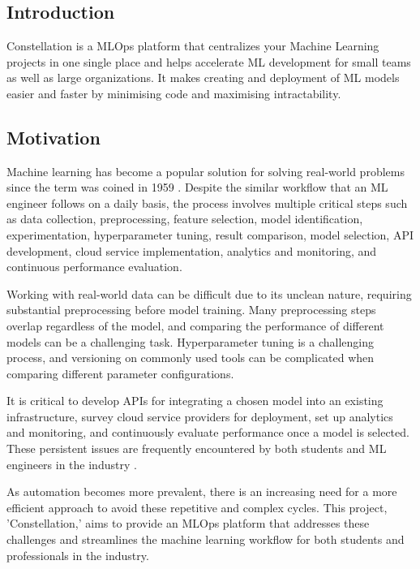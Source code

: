 \documentclass[12pt,a4paper]{report}     %
\begin{document}
\chapter{}
\begin{normalsize}
			\noindent

\section{Introduction} 	
{\setlength{\baselineskip}{1.1\baselineskip}
Constellation is a MLOps platform that centralizes your Machine Learning projects in one single place and helps accelerate ML development for small teams as well as large organizations. It makes creating and deployment of ML models easier and faster by minimising code and maximising intractability.
}	
\section{Motivation}
{\setlength{\baselineskip}{1.1\baselineskip}
Machine learning has become a popular solution for solving real-world problems since the term was coined in 1959 \cite{b1}. Despite the similar workflow that an ML engineer follows on a daily basis, the process involves multiple critical steps such as data collection, preprocessing, feature selection, model identification, experimentation, hyperparameter tuning, result comparison, model selection, API development, cloud service implementation, analytics and monitoring, and continuous performance evaluation.
\par
Working with real-world data can be difficult due to its unclean nature, requiring substantial preprocessing before model training. Many preprocessing steps overlap regardless of the model, and comparing the performance of different models can be a challenging task. Hyperparameter tuning is a challenging process, and versioning on commonly used tools can be complicated when comparing different parameter configurations.
\par
It is critical to develop APIs for integrating a chosen model into an existing infrastructure, survey cloud service providers for deployment, set up analytics and monitoring, and continuously evaluate performance once a model is selected. These persistent issues are frequently encountered by both students and ML engineers in the industry \cite{b2}.
\par
As automation becomes more prevalent, there is an increasing need for a more efficient approach to avoid these repetitive and complex cycles. This project, 'Constellation,' aims to provide an MLOps platform that addresses these challenges and streamlines the machine learning workflow for both students and professionals in the industry.
\par}	


\end{normalsize}
\end{document}
